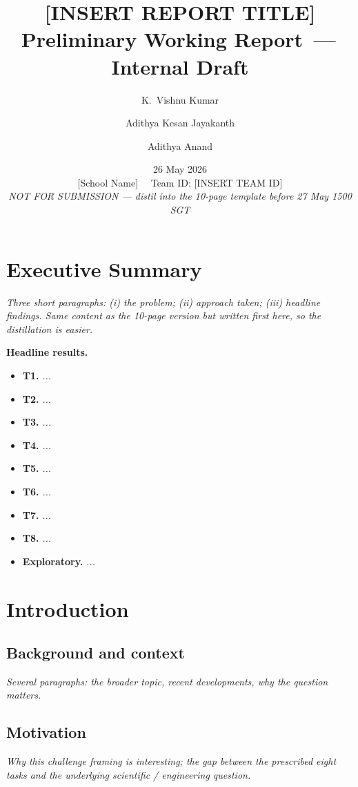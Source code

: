 \documentclass[12pt,a4paper]{article}
\title{\vspace{-1.8cm}\Huge\bfseries [INSERT REPORT TITLE]\\[0.5em]
\Large Preliminary Working Report \,—\, Internal Draft}
\author{K.\ Vishnu Kumar \and Adithya Kesan Jayakanth \and Adithya Anand}
\date{26 May 2026\\[0.3em]\small [School Name] \ \textperiodcentered\ Team ID: [INSERT TEAM ID]\\[0.2em]\small\itshape NOT FOR SUBMISSION — distil into the 10-page template before 27 May 1500 SGT}
\newcommand{\ph}[1]{\textit{\textcolor{phgray}{#1}}}
\begin{document}
\maketitle
\thispagestyle{empty}

\tableofcontents
\newpage

\section{Executive Summary}
\ph{Three short paragraphs: (i) the problem; (ii) approach taken; (iii) headline findings. Same content as the 10-page version but written first here, so the distillation is easier.}

\textbf{Headline results.}
\begin{itemize}[leftmargin=*, itemsep=1pt]
\item \textbf{T1.} \ph{...}
\item \textbf{T2.} \ph{...}
\item \textbf{T3.} \ph{...}
\item \textbf{T4.} \ph{...}
\item \textbf{T5.} \ph{...}
\item \textbf{T6.} \ph{...}
\item \textbf{T7.} \ph{...}
\item \textbf{T8.} \ph{...}
\item \textbf{Exploratory.} \ph{...}
\end{itemize}

\section{Introduction}
\subsection{Background and context}
\ph{Several paragraphs: the broader topic, recent developments, why the question matters.}

\subsection{Motivation}
\ph{Why this challenge framing is interesting; the gap between the prescribed eight tasks and the underlying scientific / engineering question.}
\end{document}
